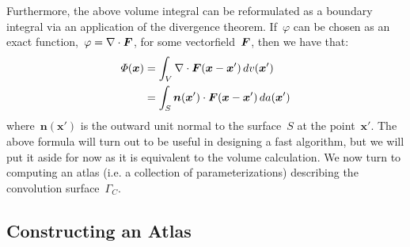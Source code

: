 \documentclass[11pt]{article}
\newcommand{\vct}{\vectorsym}
\newcommand\bx{\boldsymbol x}
\newcommand\bn{\boldsymbol n}
\renewcommand{\phi}{\varphi}
\begin{document}
Furthermore, the above volume integral can be reformulated as a
boundary integral via an application of the divergence
theorem. If~$\phi$ can be chosen as an exact
function,~$\phi = \nabla \cdot \vct{F}$, for some
vectorfield~$\vct{F}$, then we have that:
\begin{equation}
  \begin{aligned}
    \Phi(\bx) &= \int_{V} \nabla \cdot \vct{F}(\bx-\bx') \, dv(\bx') \\
    &= \int_{S} \bn(\bx') \cdot \vct{F}(\bx-\bx') \, da(\bx')
  \end{aligned}
\end{equation}
where~$\bn(\bx')$ is the outward unit normal to the surface~$S$ at the
point~$\bx'$. The above formula will turn out to be useful in
designing a fast algorithm, but we will put it aside for now as it is
equivalent to the volume calculation. We now turn to computing an
atlas (i.e. a collection of parameterizations) describing the
convolution surface~$\Gamma_C$.





\subsection{Constructing an Atlas}
\end{document}
